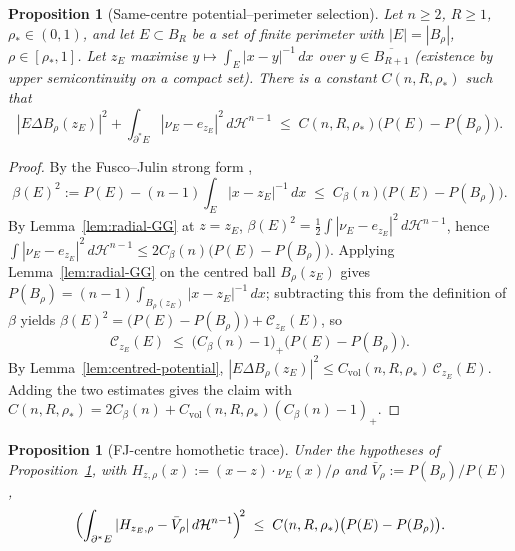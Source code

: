 \documentclass[11pt]{amsart}
\newtheorem{proposition}[theorem]{Proposition}
\theoremstyle{definition}
\newcommand{\rstar}{\rho_*}
\newcommand{\Hn}{\mathcal H^{n-1}}
\newcommand{\Per}{P}
\begin{document}
\begin{proposition}[Same-centre potential--perimeter selection]
\label{prop:potential-perimeter-selection}
Let \(n\ge2\), \(R\ge1\), \(\rstar\in(0,1)\), and let \(E\subset B_R\) be a
set of finite perimeter with \(|E|=|B_\rho|\), \(\rho\in[\rstar,1]\).  Let
\(z_E\) maximise \(y\mapsto \int_E|x-y|^{-1}\,dx\) over
\(y\in\overline{B_{R+1}}\) (existence by upper semicontinuity on a compact
set).  There is a constant \(C(n,R,\rstar)\) such that
\[
   |E\Delta B_\rho(z_E)|^2
   +\int_{\partial^*E}|\nu_E-e_{z_E}|^2\,d\Hn
   \;\le\; C(n,R,\rstar)\bigl(\Per(E)-\Per(B_\rho)\bigr).
\]
\end{proposition}

\begin{proof}
By the Fusco--Julin strong form \cite[Thm.~1.1 and Prop.~1.2]{FJ2014},
\[
   \beta(E)^2:=\Per(E)-(n-1)\!\int_E|x-z_E|^{-1}\,dx
   \;\le\;C_\beta(n)\bigl(\Per(E)-\Per(B_\rho)\bigr).
\]
By Lemma~\ref{lem:radial-GG} at \(z=z_E\),
\(\beta(E)^2=\tfrac12\!\int|\nu_E-e_{z_E}|^2\,d\Hn\), hence
\(\int|\nu_E-e_{z_E}|^2\,d\Hn\le 2C_\beta(n)\bigl(\Per(E)-\Per(B_\rho)\bigr)\).
Applying Lemma~\ref{lem:radial-GG} on the centred ball \(B_\rho(z_E)\) gives
\(\Per(B_\rho)=(n-1)\!\int_{B_\rho(z_E)}|x-z_E|^{-1}\,dx\); subtracting this from
the definition of \(\beta\) yields
\(\beta(E)^2=\bigl(\Per(E)-\Per(B_\rho)\bigr)+\mathcal C_{z_E}(E)\), so
\[
   \mathcal C_{z_E}(E)\;\le\;\bigl(C_\beta(n)-1\bigr)_+\bigl(\Per(E)-\Per(B_\rho)\bigr).
\]
By Lemma~\ref{lem:centred-potential},
\(|E\Delta B_\rho(z_E)|^2\le C_{\mathrm{vol}}(n,R,\rstar)\,\mathcal C_{z_E}(E)\).
Adding the two estimates gives the claim with
\(C(n,R,\rstar)=2C_\beta(n)+C_{\mathrm{vol}}(n,R,\rstar)(C_\beta(n)-1)_+\).
\end{proof}

\begin{proposition}[FJ-centre homothetic trace]\label{prop:FJ-centre-trace}
Under the hypotheses of
Proposition~\ref{prop:potential-perimeter-selection}, with
\(H_{z,\rho}(x):=(x-z)\cdot\nu_E(x)/\rho\) and
\(\bar V_\rho:=\Per(B_\rho)/\Per(E)\),
\[
   \Bigl(\int_{\partial^*E}|H_{z_E,\rho}-\bar V_\rho|\,d\Hn\Bigr)^{\!2}
   \;\le\;C(n,R,\rstar)\bigl(\Per(E)-\Per(B_\rho)\bigr).
\]
\end{proposition}
\end{document}
